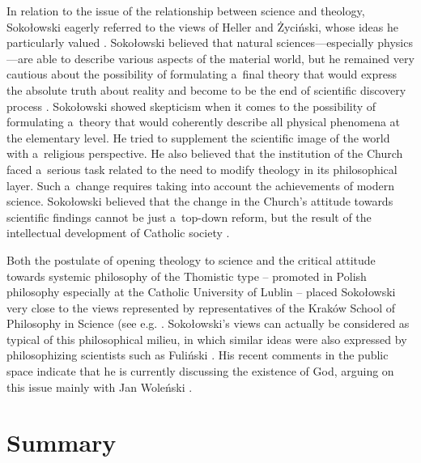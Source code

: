 \documentclass[%
  manuscript=article,
  year=2024,
  volume=77,
  doi=00000.000,
]{zfn}
\begin{document}
In relation to the issue of the relationship between science and theology, Sokołowski eagerly referred to the views of Heller and Życiński, whose ideas he particularly valued 
\parencites[see,][]{}[][p.187]{}. %
 Sokołowski believed that natural sciences---especially physics---are able to describe various aspects of the material world, but he remained very cautious about the possibility of formulating a~final theory that would express the absolute truth about reality and become to be the end of scientific discovery process 
\parencite[][]{}. %
 Sokołowski showed skepticism when it comes to the possibility of formulating a~theory that would coherently describe all physical phenomena at the elementary level. He tried to supplement the scientific image of the world with a~religious perspective. He also believed that the institution of the Church faced a~serious task related to the need to modify theology in its philosophical layer. Such a~change requires taking into account the achievements of modern science. Sokołowski believed that the change in the Church's attitude towards scientific findings cannot be just a~top-down reform, but the result of the intellectual development of Catholic society 
\parencite[][p.123]{}.%




Both the postulate of opening theology to science and the critical attitude towards systemic philosophy of the Thomistic type -- promoted in Polish philosophy especially at the Catholic University of Lublin -- placed Sokołowski very close to the views represented by representatives of the Kraków School of Philosophy in Science (see e.g. 
\parencites[][pp.228–229]{Trombik2021Koncepcje}[][]{Trombik2022Teologia}. %
 Sokołowski's views can actually be considered as typical of this philosophical milieu, in which similar ideas were also expressed by philosophizing scientists such as Fuliński 
\parencite[][]{Trombik2023Andrzej}. %
 His recent comments in the public space indicate that he is currently discussing the existence of God, arguing on this issue mainly with Jan Woleński 
\parencite[][]{}.%




\section{Summary}
\end{document}
